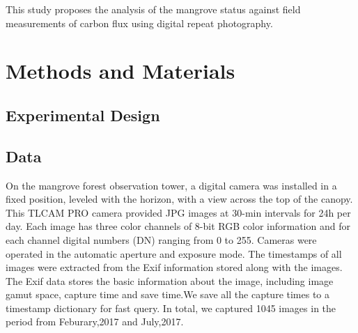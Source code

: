 \documentclass{article}
\begin{document}
This study proposes the analysis of the mangrove status against field measurements
of carbon flux using digital repeat photography.


\section{Methods and Materials}
\label{sec:headings}

\subsection{Experimental Design}


\subsection{Data}
On the mangrove forest observation tower, a digital camera was installed in a fixed position, leveled with the horizon, with a view across the top of the canopy. This TLCAM PRO camera provided JPG images at 30-min intervals for 24h per day. Each image has three color channels of 8-bit RGB color information and for each channel digital numbers (DN) ranging from 0 to 255. Cameras were operated in the automatic aperture and exposure mode. The timestamps of all images were extracted from the Exif information stored along with the images. The Exif data stores the basic information about the image, including image gamut space, capture time and save time.We save all the capture times to a timestamp dictionary for fast query. In total, we captured 1045 images in the period from Feburary,2017 and July,2017. { }
\end{document}
